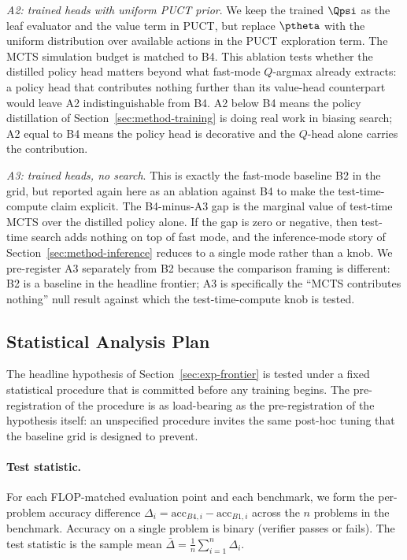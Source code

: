 \textit{A2: trained heads with uniform PUCT prior}. We keep the trained
$\Qpsi$ as the leaf evaluator and the value term in PUCT, but replace
$\ptheta$ with the uniform distribution over available actions in the
PUCT exploration term. The MCTS simulation budget is matched to B4.
This ablation tests whether the distilled policy head matters beyond
what fast-mode $Q$-argmax already extracts: a policy head that
contributes nothing further than its value-head counterpart would leave
A2 indistinguishable from B4. A2 below B4 means the policy distillation
of Section~\ref{sec:method-training} is doing real work in biasing
search; A2 equal to B4 means the policy head is decorative and the
$Q$-head alone carries the contribution.

\textit{A3: trained heads, no search}. This is exactly the fast-mode
baseline B2 in the grid, but reported again here as an ablation against
B4 to make the test-time-compute claim explicit. The B4-minus-A3 gap is
the marginal value of test-time MCTS over the distilled policy alone.
If the gap is zero or negative, then test-time search adds nothing on
top of fast mode, and the inference-mode story of
Section~\ref{sec:method-inference} reduces to a single mode rather than
a knob. We pre-register A3 separately from B2 because the comparison
framing is different: B2 is a baseline in the headline frontier; A3 is
specifically the ``MCTS contributes nothing'' null result against which
the test-time-compute knob is tested.

\subsection{Statistical Analysis Plan}
\label{sec:exp-stats}

The headline hypothesis of Section~\ref{sec:exp-frontier} is tested
under a fixed statistical procedure that is committed before any
training begins. The pre-registration of the procedure is as
load-bearing as the pre-registration of the hypothesis itself: an
unspecified procedure invites the same post-hoc tuning that the
baseline grid is designed to prevent.

\paragraph{Test statistic.}
For each FLOP-matched evaluation point and each benchmark, we form the
per-problem accuracy difference $\Delta_i = \mathrm{acc}_{B4, i} -
\mathrm{acc}_{B1, i}$ across the $n$ problems in the benchmark.
Accuracy on a single problem is binary (verifier passes or fails). The
test statistic is the sample mean $\bar{\Delta} = \frac{1}{n}
\sum_{i=1}^{n} \Delta_i$.

